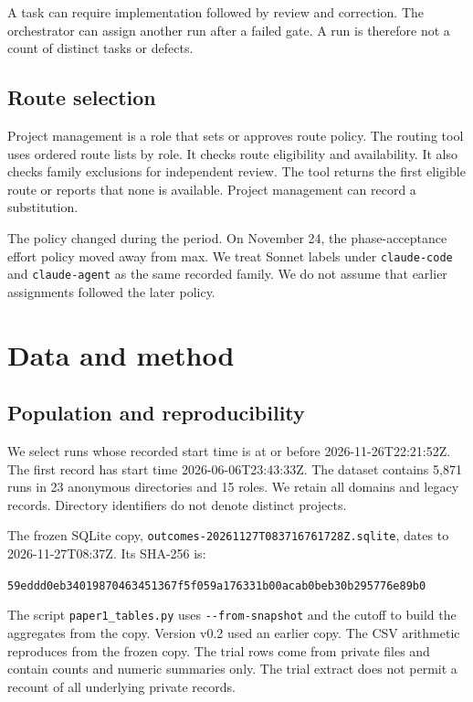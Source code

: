 \documentclass[
  10pt,
  a4paper,
]{article}
\begin{document}
A task can require implementation followed by review and correction. The
orchestrator can assign another run after a failed gate. A run is
therefore not a count of distinct tasks or defects.

\subsection{Route selection}\label{route-selection}

Project management is a role that sets or approves route policy. The
routing tool uses ordered route lists by role. It checks route
eligibility and availability. It also checks family exclusions for
independent review. The tool returns the first eligible route or reports
that none is available. Project management can record a substitution.

The policy changed during the period. On November 24, the
phase-acceptance effort policy moved away from max. We treat Sonnet
labels under \texttt{claude-code} and \texttt{claude-agent} as the same
recorded family. We do not assume that earlier assignments followed the
later policy.

\section{Data and method}\label{data-and-method}

\subsection{Population and
reproducibility}\label{population-and-reproducibility}

We select runs whose recorded start time is at or before
2026-11-26T22:21:52Z. The first record has start time
2026-06-06T23:43:33Z. The dataset contains 5,871 runs in 23 anonymous
directories and 15 roles. We retain all domains and legacy records.
Directory identifiers do not denote distinct projects.

The frozen SQLite copy, \texttt{outcomes-20261127T083716761728Z.sqlite},
dates to 2026-11-27T08:37Z. Its SHA-256 is:

\texttt{59eddd0eb34019870463451367f5f059a176331b00acab0beb30b295776e89b0}

The script \texttt{paper1\_tables.py} uses \texttt{-\/-from-snapshot}
and the cutoff to build the aggregates from the copy. Version v0.2 used
an earlier copy. The CSV arithmetic reproduces from the frozen copy. The
trial rows come from private files and contain counts and numeric
summaries only. The trial extract does not permit a recount of all
underlying private records.
\end{document}
